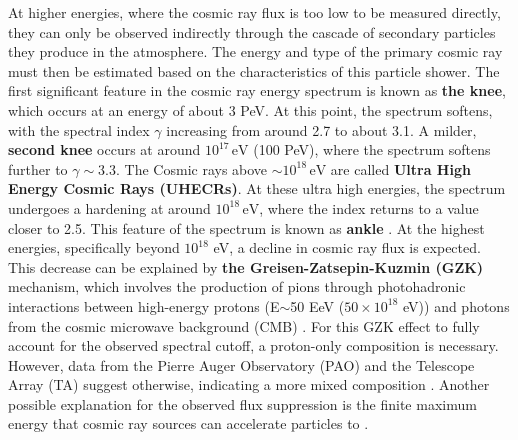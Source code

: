 
At higher energies, where the cosmic ray flux is too low to be measured directly, they can only be observed indirectly through the cascade of secondary particles they produce in the atmosphere. The energy and type of the primary cosmic ray must then be estimated based on the characteristics of this particle shower. The first significant feature in the cosmic ray energy spectrum is known as \textbf{the knee}, which occurs at an energy of about 3 PeV. At this point, the spectrum softens, with the spectral index \( \gamma \) increasing from around 2.7 to about 3.1. A milder, \textbf{second knee} occurs at around \( 10^{17} \, \text{eV} \) (100 PeV), where the spectrum softens further to $\gamma\sim3.3$.  The Cosmic rays above \( \sim10^{18} \, \text{eV} \) are called \textbf{Ultra High Energy Cosmic Rays (UHECRs)}. At these ultra high energies, the spectrum undergoes a hardening at around \( 10^{18} \, \text{eV} \), where the index returns to a value closer to 2.5. This feature of the spectrum is known as \textbf{ankle} . At the highest energies, specifically beyond \(10^{18}\) eV, a decline in cosmic ray flux is expected. This decrease can be explained by \textbf{the Greisen-Zatsepin-Kuzmin (GZK)} mechanism, which involves the production of pions through photohadronic interactions between high-energy protons (E$\sim$50 EeV ($50\times10^{18}$ eV)) and photons from the cosmic microwave background (CMB) . For this GZK effect to fully account for the observed spectral cutoff, a proton-only composition is necessary. However, data from the Pierre Auger Observatory (PAO) and the Telescope Array (TA) suggest otherwise, indicating a more mixed composition . Another possible explanation for the observed flux suppression is the finite maximum energy that cosmic ray sources can accelerate particles to .

